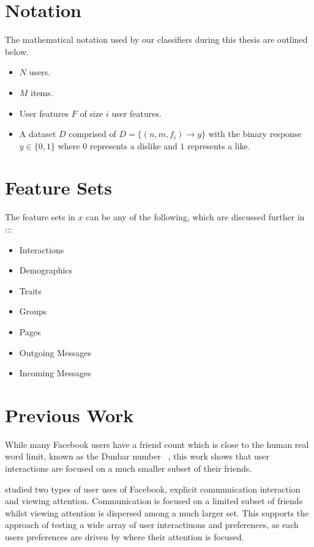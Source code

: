 \section{Notation}
\label{sec:notation}

The mathematical notation used by our classifiers during this thesis are outlined below.

\begin{itemize}
\item $N$ users. 
\item $M$ items.
\item User features $F$ of size $i$ user features.
\item A dataset $D$ comprised of $D = \{(n,m,f_i) \to y\}$ with the binary response $y \in \{0,1\}$ where $0$ represents a dislike and $1$ 
represents a like.
\end{itemize}

\section{Feature Sets}
\label{sec:features}

The feature sets in $x$ can be any of the following, which are discussed further in :::

\begin{itemize}
\item Interactions
\item Demographics
\item Traits
\item Groups
\item Pages
\item Outgoing Messages
\item Incoming Messages
\end{itemize}

\section{Previous Work}
\label{sec:pw}

While many Facebook users have a friend count which is close to the human real word limit, known as the Dunbar number ~\cite{hill2003social},
this work shows that user interactions are focused on a much smaller subset of their friends.

\cite{backstrom2011center} studied two types of user uses of Facebook, explicit communication interaction and viewing attention. Communication 
is focused on a limited subset of friends whilst viewing attention is dispersed among a much larger set. This supports the approach of testing
a wide array of user interactiuons and preferences, as each users preferences are driven by where their attention is focused.

